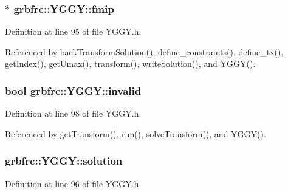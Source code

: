 \subsubsection[{\texorpdfstring{fmip}{fmip}}]{$\ast$ grbfrc\+::\+Y\+G\+G\+Y\+::fmip\hspace{0.3cm}{\ttfamily [private]}}\hypertarget{classgrbfrc_1_1YGGY_aa4f63c22c95cd48cd87756ebc5de53aa}{}\label{classgrbfrc_1_1YGGY_aa4f63c22c95cd48cd87756ebc5de53aa}


Definition at line 95 of file Y\+G\+G\+Y.\+h.



Referenced by back\+Transform\+Solution(), define\+\_\+constraints(), define\+\_\+tx(), get\+Index(), get\+Umax(), transform(), write\+Solution(), and Y\+G\+G\+Y().

\subsubsection[{\texorpdfstring{invalid}{invalid}}]{\setlength{\rightskip}{0pt plus 5cm}bool grbfrc\+::\+Y\+G\+G\+Y\+::invalid\hspace{0.3cm}{\ttfamily [private]}}\hypertarget{classgrbfrc_1_1YGGY_aafe4efd740534f2ca752ac187e247025}{}\label{classgrbfrc_1_1YGGY_aafe4efd740534f2ca752ac187e247025}


Definition at line 98 of file Y\+G\+G\+Y.\+h.



Referenced by get\+Transform(), run(), solve\+Transform(), and Y\+G\+G\+Y().

\subsubsection[{\texorpdfstring{solution}{solution}}]{ grbfrc\+::\+Y\+G\+G\+Y\+::solution\hspace{0.3cm}{\ttfamily [private]}}\hypertarget{classgrbfrc_1_1YGGY_a26d38a8358290866b02c11a09ddd5b4e}{}\label{classgrbfrc_1_1YGGY_a26d38a8358290866b02c11a09ddd5b4e}


Definition at line 96 of file Y\+G\+G\+Y.\+h.



